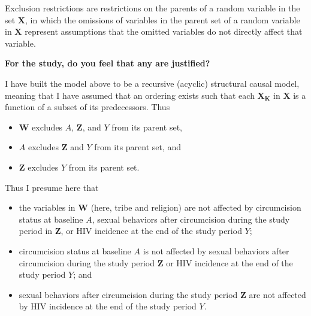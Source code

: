 \documentclass{article}
\begin{document}
\begin{enumerate}[label=\textbf{(\alph*)}]
  Exclusion restrictions are restrictions on the parents of a random variable in the set $\bm{X}$, in which the omissions of variables in the parent set of a random variable in $\bm{X}$ represent assumptions that the omitted variables do not directly affect that variable.  
  
  \textbf{For the study, do you feel that any are justified?}
  
  I have built the model above to be a recursive (acyclic) structural causal model, meaning that I have assumed that an ordering exists such that each $\bm{X_K}$ in $\bm{X}$ is a function of a subset of its predecessors. Thus 
  \begin{itemize}
      \item $\bm{W}$ excludes $A$, $\bm{Z}$, and $Y$ from its parent set,
      \item $A$ excludes $\bm{Z}$ and $Y$ from its parent set, and
      \item $\bm{Z}$ excludes $Y$ from its parent set.
  \end{itemize} 
  
  Thus I presume here that 
  \begin{itemize}
      \item the variables in $\bm{W}$ (here, tribe and religion) are not affected by circumcision status at baseline $A$, sexual behaviors after circumcision during the study period in $\bm{Z}$, or HIV incidence at the end of the study period $Y$;
      \item circumcision status at baseline $A$ is not affected by sexual behaviors after circumcision during the study period $\bm{Z}$ or HIV incidence at the end of the study period $Y$; and
      \item sexual behaviors after circumcision during the study period $\bm{Z}$ are not affected by HIV incidence at the end of the study period $Y$.
  \end{itemize}
  

\end{enumerate}
\end{document}
